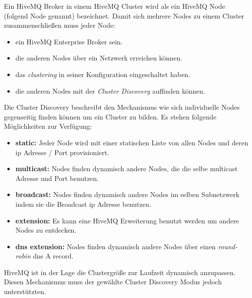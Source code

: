 Ein HiveMQ Broker in einem HiveMQ Cluster wird als ein HiveMQ Node (folgend Node genannt) bezeichnet.
Damit sich mehrere Nodes zu einem Cluster zusammenschlie{\ss}en muss jeder Node:
\begin{itemize}
    \item ein HiveMQ Enterprise Broker sein.
    \item die anderen Nodes über ein Netzwerk erreichen können.
    \item das \textit{clustering} in seiner Konfiguration eingeschaltet haben.
    \item die anderen Nodes mit der \textit{Cluster Discovery} auffinden können.
\end{itemize}
Die Cluster Discovery beschreibt den Mechanismus wie sich individuelle Nodes gegenseitig finden können um ein Cluster zu bilden. Es stehen folgende Möglichkeiten zur Verfügung:
\begin{itemize}
    \item \textbf{static:} Jeder Node wird mit einer statischen Liste von allen Nodes und deren \ac{ip} Adresse / Port provisioniert.
    \item \textbf{multicast:} Nodes finden dynamisch andere Nodes, die die selbe multicast Adresse und Port benutzen.
    \item \textbf{broadcast:} Nodes finden dynamisch andere Nodes im selben Subnetzwerk indem sie die Broadcast \ac{ip} Adresse benutzen.
    \item \textbf{extension:} Es kann eine HiveMQ Erweiterung benutzt werden um andere Nodes zu entdecken.
    \item \textbf{dns extension:} Nodes finden dynamisch andere Nodes über einen \textit{round-robin} \acs{dns} A record.
\end{itemize}
HiveMQ ist in der Lage die Clustergrö{\ss}e zur Laufzeit dynamisch anzupassen. Diesen Mechanismus muss der gewählte Cluster Discovery Modus jedoch unterstützten.
\cite{HiveMQClusterHiveMQ}

